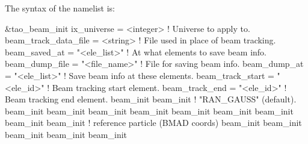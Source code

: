 {{{{{{{{{{The syntax of the  namelist is:
\begin{example}
  &tao_beam_init
    ix_universe               = <integer>     ! Universe to apply to.
    beam_track_data_file      = <string>      ! File used in place of beam tracking.
    beam_saved_at             = "<ele_list>"  ! At what elements to save beam info.
    beam_dump_file            = "<file_name>" ! File for saving beam info.
    beam_dump_at              = "<ele_list>"  ! Save beam info at these elements.
    beam_track_start          = "<ele_id>"    ! Beam tracking start element.
    beam_track_end            = "<ele_id>"    ! Beam tracking end element.
    beam_init%
    beam_init%
                                              !   "RAN_GAUSS" (default).
    beam_init%
    beam_init%
    beam_init%
    beam_init%
    beam_init%
    beam_init%
    beam_init%
    beam_init%
    beam_init%
                                              !   reference particle (BMAD coords)
    beam_init%
    beam_init%
    beam_init%
    beam_init%
    beam_init%

\end{example}}}}}}}}}}}

